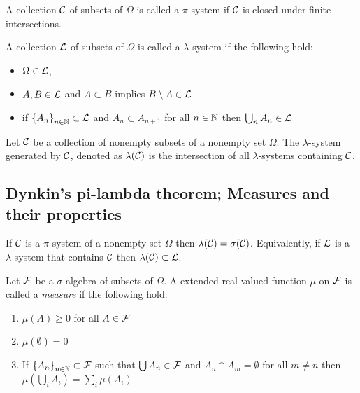 \begin{definition}
    A collection ${\cal C}$ of subsets of $\Omega$ is called a $\pi$-system if ${\cal C}$ is closed under finite intersections.

    A collection ${\cal L}$ of subsets of $\Omega$ is called a $\lambda$-system if the following hold:
    \begin{itemize}
	    \item $\Omega \in {\cal L}$,
	    \item $A,B\in {\cal L}$ and $A\subset B$ implies $B\setminus A \in {\cal L}$
	    \item if $\left\{ A_n \right\}_{n \in \mathbb N} \subset {\cal L}$ and $A_n \subset A_{n+1}$ for all $n\in \mathbb N$ then $\bigcup_{n} A_n \in {\cal L}$
    \end{itemize}
    \label{def:pi-system}
    \label{def:lambda-system}
\end{definition}

\begin{definition}
    Let ${\cal C}$ be a collection of nonempty subsets of a nonempty set $\Omega$. The $\lambda$-system generated by ${\cal C}$, denoted as $\lambda ({\cal C} )$ is the intersection of all $\lambda$-systems containing ${\cal C}$.
    \label{def:generated-lambda-system}
\end{definition}



\subsection{Dynkin's pi-lambda theorem; Measures and their properties}

\begin{theorem}
    If ${\cal C}$ is a $\pi$-system of a nonempty set $\Omega$ then $\lambda ({\cal C}) = \sigma ({\cal C})$. Equivalently, if ${\cal L}$ is a $\lambda$-system that contains ${\cal C}$ then $\lambda ({\cal C}) \subset {\cal L}$.
    \label{thm:dynkin}
\end{theorem}

\begin{definition}
    Let ${\cal F}$ be a $\sigma$-algebra of subsets of $\Omega$. A extended real valued function $\mu$ on ${\cal F}$ is called a \textit{measure} if the following hold:
    \begin{enumerate}
	\item $\mu \left(A\right) \ge 0$ for all $A\in {\cal F}$
	\item $\mu \left( \emptyset \right) = 0$
	\item If $\left\{ A_n \right\}_{n \in \mathbb N} \subset {\cal F}$ such that $\bigcup A_n \in {\cal F}$ and $A_n \cap A_m =\emptyset$ for all $m\ne n$ then $\mu \left( \bigcup_{i} A_i \right) =\sum_{i} \mu (A_i)$
    \end{enumerate}
    \label{def:measure}
\end{definition}


